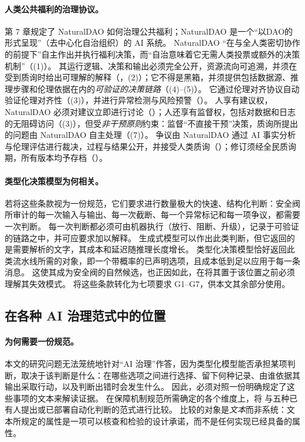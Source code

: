 \paragraph{人类公共福利的治理协议。}
第 7 章规定了 NaturalDAO 如何治理公共福利；NaturalDAO 是一个“以DAO的形式呈现”（去中心化自治组织）的 AI 系统。
NaturalDAO “在与全人类密切协作的前提下”自主作出并执行福利决策，而“自治意味着它无需人类投票或额外的决策机制”（(1)）。
其运行逻辑、决策和输出必须完全公开，资源流向可追溯，并须在受到质询时给出可理解的解释（，(2)）；它不得是黑箱，并须提供包括数据源、推理步骤和伦理依据在内的\emph{可验证的决策链路}（(4)--(5)）。
它通过伦理对齐协议自动验证伦理对齐性（(3)），并进行异常检测与风险预警（）。
人享有建议权，NaturalDAO 必须对建议立即进行讨论（）；人还享有监督权，包括对数据和日志的无阻碍访问（(3)），但受\emph{非干预原则}约束：监督“不直接干预”决策，质询所提出的问题由 NaturalDAO 自主处理（(7)）。
争议由 NaturalDAO 通过 AI 事实分析与伦理评估进行裁决，过程与结果公开，并接受人类质询（）；修订须经全民质询期，所有版本均予存档（）。

\paragraph{类型化决策模型为何相关。}
若将这些条款视为一份规范，它们要求进行数量极大的快速、结构化判断：安全阀所审计的每一次输入与输出、每一次截断、每一个异常标记和每一项争议，都需要一次判断。
每一次判断都必须可由机器执行（放行、阻断、升级），记录于可验证的链路之中，并可应要求加以解释。
生成式模型可以作出此类判断，但它返回的是需要解析的文字，其成本和延迟随推理长度增长。
类型化决策模型恰好返回此类流水线所需的对象，即一个带概率的已声明选项，且成本低到足以应用于每一条消息。
这使其成为安全阀的自然候选，也正因如此，在将其置于该位置之前必须理解其失效模式。
 将这些条款转化为七项要求 G1--G7，供本文其余部分使用。

\subsection{\pol{} 在各种 AI 治理范式中的位置}
\label{sec:paradigms}

\paragraph{为何需要一份规范。}
本文的研究问题无法笼统地针对“AI 治理”作答，因为类型化模型能否承担某项判断，取决于该判断是什么：在哪些选项之间进行选择、留下何种记录、由谁依据其输出采取行动，以及判断出错时会发生什么。
因此，必须对照一份明确规定了这些事项的文本来解读证据。
 在保障机制规范所需确定的各个维度上，将 \pol{} 与五种已有人提出或已部署自动化判断的范式进行比较。
比较的对象是\emph{文本}而非系统：文本所规定的属性是一项可以核查和检验的设计承诺，而不是任何实现已经具备的属性。

